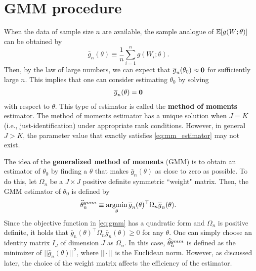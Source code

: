 \documentclass[11pt, A4paper, openany, uplatex]{book}
\begin{document}
\section{GMM procedure}
When the data of sample size $n$ are available, the sample analogue of $\mathbb{E} [g(W; \theta)]$ can be obtained by
\[
	\bar{g}_n(\theta) \equiv \frac{1}{n}\sum_{i = 1}^n g(W_i; \theta).
\]
Then, by the law of large numbers, we can expect that $\overline{g}_n(\theta_0) \approx \mathbf{0}$ for sufficiently large $n$.
This implies that one can consider estimating $\theta_0$ by solving
\begin{align}\label{eq:mm_estimator}
	\overline{g}_n(\theta) = \mathbf{0}
\end{align}
with respect to $\theta$.
This type of estimator is called the \textbf{method of moments} estimator.
The method of moments estimator has a unique solution when $J = K$ (i.e., just-identification) under appropriate rank conditions.
However, in general $J > K$, the parameter value that exactly satisfies \eqref{eq:mm_estimator} may not exist.

The idea of the \textbf{generalized method of moments} (GMM) is to obtain an estimator of $\theta_0$ by finding a $\theta$ that makes $\bar{g}_n(\theta)$ as close to zero as possible. 
To do this, let $\Omega_n$ be a $J \times J$ positive definite symmetric ``weight" matrix.
Then, the GMM estimator of $\theta_0$ is defined by
\begin{align}\label{eq:gmm}
	\widehat{\theta}_n^{gmm} \equiv \operatorname*{\arg\!\min}_{\theta} \overline{g}_n(\theta)^\top \Omega_n \overline{g}_n(\theta).
\end{align}
Since the objective function in \eqref{eq:gmm} has a quadratic form and $\Omega_n$ is positive definite, it holds that $\bar{g}_n(\theta)^\top \Omega_n \bar{g}_n(\theta) \geq 0$ for any $\theta$.
One can simply choose an identity matrix $I_J$ of dimension $J$ as $\Omega_n$.
In this case, $\widehat{\theta}_n^{gmm}$ is defined as the minimizer of $||\bar{g}_n(\theta) ||^2$, where $||\cdot||$ is the Euclidean norm.
However, as discussed later, the choice of the weight matrix affects the efficiency of the estimator.
\end{document}
